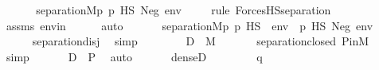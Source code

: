 \begin{isabellebody}
\ \ \isamarkupfalse%
\isanewline
\ \ \isamarkupfalse%
\ {\isachardoublequoteopen}separation{\isacharparenleft}{\kern0pt}{\isacharhash}{\kern0pt}{\isacharhash}{\kern0pt}M{\isacharcomma}{\kern0pt}{\isasymlambda}p{\isachardot}{\kern0pt}\ {\isacharparenleft}{\kern0pt}p\ {\isasymtturnstile}HS\ Neg{\isacharparenleft}{\kern0pt}{\isasymphi}{\isacharparenright}{\kern0pt}\ env{\isacharparenright}{\kern0pt}{\isacharparenright}{\kern0pt}{\isachardoublequoteclose}\isanewline
\ \ \ \ \isamarkupfalse%
{\isacharparenleft}{\kern0pt}rule\ ForcesHS{\isacharunderscore}{\kern0pt}separation{\isacharparenright}{\kern0pt}\isanewline
\ \ \ \ \isamarkupfalse%
\ assms\ envin\isanewline
\ \ \ \ \isamarkupfalse%
\ auto\isanewline
\ \ \isamarkupfalse%
\isanewline
\ \ \isamarkupfalse%
\ {\isachardoublequoteopen}separation{\isacharparenleft}{\kern0pt}{\isacharhash}{\kern0pt}{\isacharhash}{\kern0pt}M{\isacharcomma}{\kern0pt}{\isasymlambda}p{\isachardot}{\kern0pt}\ {\isacharparenleft}{\kern0pt}p\ {\isasymtturnstile}HS\ {\isasymphi}\ env{\isacharparenright}{\kern0pt}\ {\isasymor}\ {\isacharparenleft}{\kern0pt}p\ {\isasymtturnstile}HS\ Neg{\isacharparenleft}{\kern0pt}{\isasymphi}{\isacharparenright}{\kern0pt}\ env{\isacharparenright}{\kern0pt}{\isacharparenright}{\kern0pt}{\isachardoublequoteclose}\ \isanewline
\ \ \ \ \isamarkupfalse%
\ separation{\isacharunderscore}{\kern0pt}disj\ \isamarkupfalse%
\ simp\isanewline
\ \ \isamarkupfalse%
\ \isanewline
\ \ \isamarkupfalse%
\ {\isachardoublequoteopen}{\isacharquery}{\kern0pt}D\ {\isasymin}\ M{\isachardoublequoteclose}\ \isanewline
\ \ \ \ \isamarkupfalse%
\ separation{\isacharunderscore}{\kern0pt}closed\ P{\isacharunderscore}{\kern0pt}in{\isacharunderscore}{\kern0pt}M\ \isamarkupfalse%
\ simp\isanewline
\ \ \isamarkupfalse%
\isanewline
\ \ \isamarkupfalse%
\ {\isachardoublequoteopen}{\isacharquery}{\kern0pt}D\ {\isasymsubseteq}\ P{\isachardoublequoteclose}\ \isamarkupfalse%
\ auto\isanewline
\ \ \isamarkupfalse%
\isanewline
\ \ \isamarkupfalse%
\ {\isachardoublequoteopen}dense{\isacharparenleft}{\kern0pt}{\isacharquery}{\kern0pt}D{\isacharparenright}{\kern0pt}{\isachardoublequoteclose}\isanewline
\ \ \isamarkupfalse%
\isanewline
\ \ \ \ \isamarkupfalse%
\ q\isanewline
\ \ \ \ \isamarkupfalse%

\end{isabellebody}

